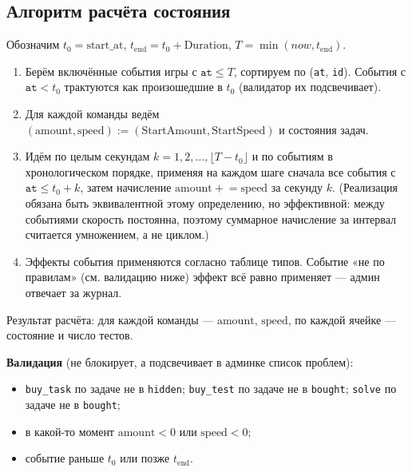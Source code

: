 \documentclass[12pt,a4paper]{article}
\newcommand{\field}[1]{\texttt{#1}}
\begin{document}
\subsection{Алгоритм расчёта состояния}
\label{sec:statecalc}

Обозначим $t_0 = \mathrm{start\_at}$,
$t_{\mathrm{end}} = t_0 + \mathrm{Duration}$,
$T = \min(now, t_{\mathrm{end}})$.

\begin{enumerate}[nosep]
  \item Берём включённые события игры с $\field{at} \le T$, сортируем по
        (\field{at}, \field{id}). События с $\field{at} < t_0$ трактуются
        как произошедшие в $t_0$ (валидатор их подсвечивает).
  \item Для каждой команды ведём $(\mathrm{amount}, \mathrm{speed}) :=
        (\mathrm{StartAmount}, \mathrm{StartSpeed})$ и состояния задач.
  \item Идём по целым секундам $k = 1, 2, \dots, \lfloor T - t_0 \rfloor$
        и по событиям в хронологическом порядке, применяя на каждом шаге
        сначала все события с $\field{at} \le t_0 + k$, затем начисление
        $\mathrm{amount} \mathrel{+}= \mathrm{speed}$ за секунду $k$.
        (Реализация обязана быть эквивалентной этому определению, но
        эффективной: между событиями скорость постоянна, поэтому суммарное
        начисление за интервал считается умножением, а не циклом.)
  \item Эффекты события применяются согласно таблице типов. Событие
        «не по правилам» (см. валидацию ниже) эффект всё равно применяет ---
        админ отвечает за журнал.
\end{enumerate}

Результат расчёта: для каждой команды --- $\mathrm{amount}$,
$\mathrm{speed}$, по каждой ячейке --- состояние и число тестов.

\textbf{Валидация} (не блокирует, а подсвечивает в админке список проблем):

\begin{itemize}[nosep]
  \item \field{buy\_task} по задаче не в \field{hidden};
        \field{buy\_test} по задаче не в \field{bought};
        \field{solve} по задаче не в \field{bought};
  \item в какой-то момент $\mathrm{amount} < 0$ или $\mathrm{speed} < 0$;
  \item событие раньше $t_0$ или позже $t_{\mathrm{end}}$.
\end{itemize}
\end{document}
